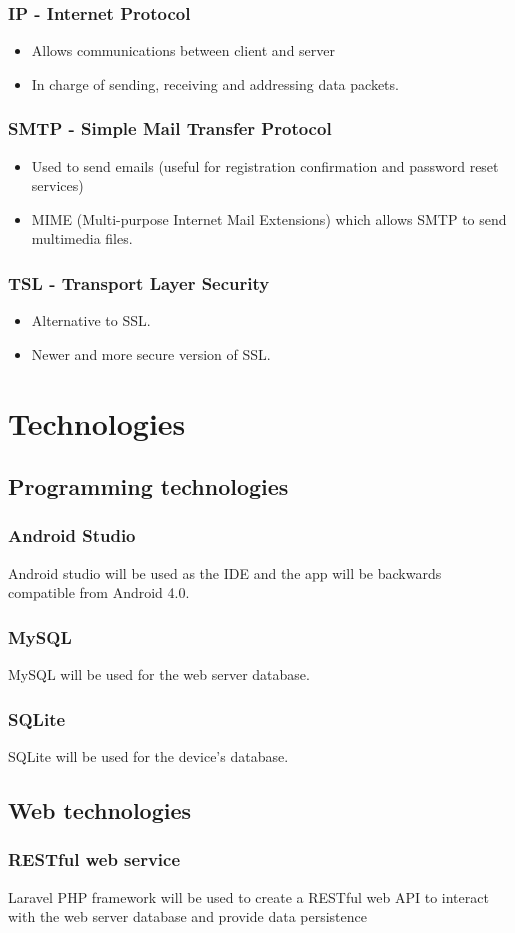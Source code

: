 \documentclass[hidelinks,a4paper,12pt]{article}
\begin{document}
	\subsubsection {IP - Internet Protocol}
	\begin{itemize}
		\item Allows communications between client and server
		\item In charge of sending, receiving and addressing data packets.
	\end{itemize}
	\subsubsection {SMTP - Simple Mail Transfer Protocol}
	\begin{itemize}
		\item Used to send emails (useful for registration confirmation and password reset services)
		\item MIME (Multi-purpose Internet Mail Extensions) which allows SMTP
to send multimedia files.
	\end{itemize}
	\subsubsection {TSL - Transport Layer Security}
	\begin{itemize}
		\item Alternative to SSL.
		\item Newer and more secure version of SSL.
	\end{itemize}		
		
\section{Technologies}
	\subsection{Programming technologies}
		\subsubsection{Android Studio}
			Android studio will be used as the IDE and the app will be backwards compatible from Android 4.0. 
		\subsubsection{MySQL}
			MySQL will be used for the web server database.
		\subsubsection{SQLite}
			SQLite will be used for the device's database.
	\subsection{Web technologies}
		\subsubsection{RESTful web service}
			Laravel PHP framework will be used to create a RESTful web API to interact with the web server database and provide data persistence
		
\end{document}
